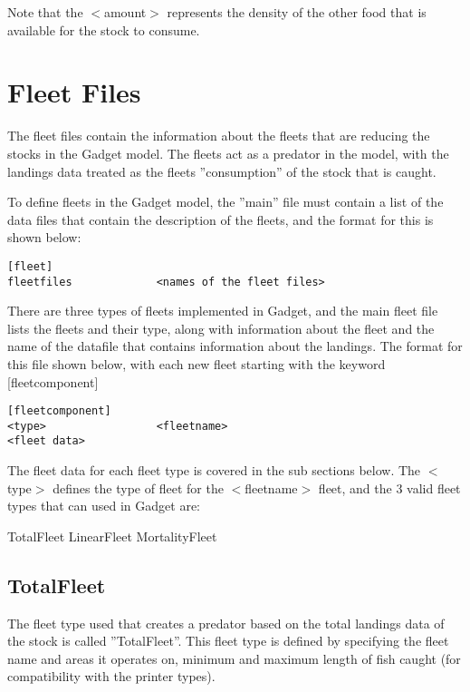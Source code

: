\documentclass [a4paper, 10pt]{book}
\begin{document}
Note that the $<$amount$>$ represents the density of the other food that is available for the stock to consume.

\chapter{Fleet Files}\label{chap:fleet}
The fleet files contain the information about the fleets that are reducing the stocks in the Gadget model.  The fleets act as a predator in the model, with the landings data treated as the fleets ''consumption'' of the stock that is caught.

\bigskip
To define fleets in the Gadget model, the ''main'' file must contain a list of the data files that contain the description of the fleets, and the format for this is shown below:

{\small\begin{verbatim}
[fleet]
fleetfiles             <names of the fleet files>
\end{verbatim}}

There are three types of fleets implemented in Gadget, and the main fleet file lists the fleets and their type, along with information about the fleet and the name of the datafile that contains information about the landings.  The format for this file shown below, with each new fleet starting with the keyword [fleetcomponent]

{\small\begin{verbatim}
[fleetcomponent]
<type>                 <fleetname>
<fleet data>
\end{verbatim}}

The fleet data for each fleet type is covered in the sub sections below.  The $<$type$>$ defines the type of fleet for the $<$fleetname$>$ fleet, and the 3 valid fleet types that can used in Gadget are:

\bigskip
TotalFleet\newline
LinearFleet\newline
MortalityFleet

\newpage
\section{TotalFleet}\label{sec:totalfleet}
The fleet type used that creates a predator based on the total landings data of the stock is called ''TotalFleet''.  This fleet type is defined by specifying the fleet name and areas it operates on, minimum and maximum length of fish caught (for compatibility with the printer types).
\end{document}
